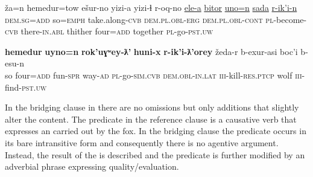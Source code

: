 \documentclass[output=paper]{LSP/langsci}
\begin{document}
\begin{exe}
	\ex	\label{ex:11ab}
	\begin{xlist}
		\ex	\label{ex:11a}
		\gll	ža=n   			hemedur=tow  	ešur-no       			yizi-a yizi-ɬ       				r-oq-no       			\underline{ele-a\smash{y}}     		\underline{bitor}  \underline{uno=n}   	\underline{sada}    			\underline{r-ik’i-n} \\
			\textsc{dem.sg=add} 	so=\textsc{emph} 		take.along-\textsc{cvb} 	\textsc{dem.pl.obl-erg}  \textsc{dem.pl.obl-cont} 	\textsc{pl}-become-\textsc{cvb} 	there-\textsc{in.abl} 	thither four=\textsc{add} 	together 			\textsc{pl}-go-\textsc{pst.uw}\\
		\glt	{}

		\ex	\label{ex:11b}
		\gll		\textbf{hemedur}   \textbf{uyno=n}   	\textbf{rok’uɣʷey-ƛ’}    	\textbf{huni-x}      	\textbf{r-ik’i-ƛ’orey}  žeda-r     			b-exur-asi     	boc’i 		b-esu-n \\
			so        		four=\textsc{add} 	fun-\textsc{spr} 			way-\textsc{ad} \textsc{pl}-go-\textsc{sim.cvb} \textsc{dem.obl-in.lat} 		\textsc{iii}-kill-\textsc{res.ptcp} 	wolf    	\textsc{iii}-find-\textsc{pst.uw}  \\
		\glt	{} 
	\end{xlist}
\end{exe}


In the bridging clause in  there are no omissions but only additions that slightly alter the content. The predicate in the reference clause is a causative verb that expresses an  carried out by the fox. In the bridging clause the predicate occurs in its bare intransitive form and consequently there is no agentive argument. Instead, the result of the  is described and the predicate is further modified by an adverbial phrase expressing quality/evaluation.
\end{document}
